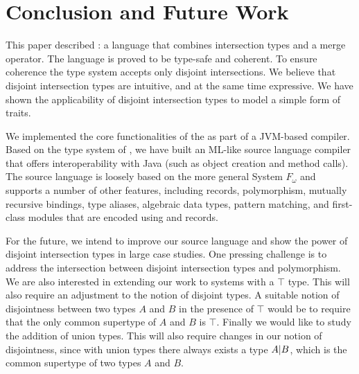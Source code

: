 \section{Conclusion and Future Work}
\label{sec:conclusion}

This paper described \name: a language that combines
intersection types and a merge operator.
The language is proved to be type-safe and coherent.
To ensure coherence the type system accepts only
disjoint intersections. We believe that disjoint intersection types are
intuitive, and at the same time expressive. We have shown the
applicability of disjoint intersection types to model a simple form of traits.

We implemented the core functionalities of the \name as part of a JVM-based
compiler. Based on the type system of \name, we have built an ML-like
source language compiler that offers interoperability with Java (such as object
creation and method calls). The source language is loosely based on the more
general System $F_{\omega}$ and supports a
number of other features, including records, polymorphism, mutually recursive
 bindings, type aliases, algebraic data types, pattern matching, and
first-class modules that are encoded using  and records.

For the future, we intend to improve our source language
and show the power of disjoint intersection types in large case
studies. One pressing challenge is to address the intersection between 
disjoint intersection types and polymorphism.
We are also interested in extending our work
to systems with a $\top$ type. This will also require an adjustment
to the notion of disjoint types. A suitable notion of
disjointness between two types $A$ and $B$ in the presence of $\top$
would be to require that the only common supertype of $A$ and $B$ is $\top$.
Finally we would like to study the
addition of union types. This will also require changes in our
notion of disjointness, since with union types there always exists
a type $A | B$, which is the common supertype of two
types $A$ and $B$.

